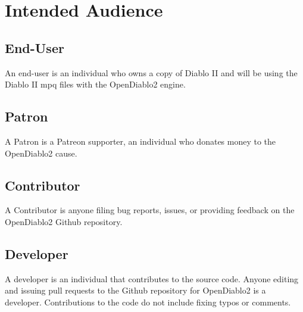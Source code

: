 \section{Intended Audience} \label{sec:audience}


\subsection{End-User}
An end-user is an individual who owns a copy of Diablo II and will be using the Diablo II mpq files with the OpenDiablo2 engine.

\subsection{Patron}
A Patron is a Patreon supporter, an individual who donates money to the OpenDiablo2 cause.

\subsection{Contributor}
A Contributor is anyone filing bug reports, issues, or providing feedback on the OpenDiablo2 Github repository.

\subsection{Developer}
A developer is an individual that contributes to the source code.
Anyone editing and issuing pull requests to the Github repository for OpenDiablo2 is a developer. Contributions to the code do not include fixing typos or comments.

